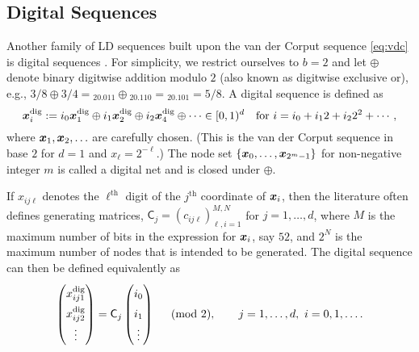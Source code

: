 \documentclass{svproc}
\begin{document}
\subsection{Digital Sequences} \label{sec:digital}

Another family of LD sequences built upon the van der Corput sequence \eqref{eq:vdc} is digital sequences \cite{DicPil10a,Nie92}.  For simplicity, we restrict ourselves to $b = 2$ and let $\oplus$ denote binary digitwise addition modulo $2$ (also known as digitwise exclusive or), e.g., $3/8 \oplus 3/4 = {}_20.011 \oplus {}_20.110 = {}_20.101 = 5/8$.  A digital sequence is defined as
\begin{equation} \label{eq:digital}
	{\boldsymbol{x}}_i^{\text{dig}} := i_0 {\boldsymbol{x}}^{\text{dig}} _1 \oplus i_1 {\boldsymbol{x}}^{\text{dig}} _2 \oplus i_2 {\boldsymbol{x}}^{\text{dig}} _4 \oplus \cdots \in [0,1)^d \quad \text{for }
	i = i_0 + i_12 + i_2 2^2 + \cdots,
\end{equation}
where ${\boldsymbol{x}}_1, {\boldsymbol{x}}_2, \ldots$ are carefully chosen.  (This is the van  der Corput sequence in base $2$ for $d=1$ and $x_\ell = 2^{-\ell}$.) The node set $\{ {\boldsymbol{x}}_0, \ldots, {\boldsymbol{x}}_{2^m-1}\}$  for non-negative integer $m$ is called a digital net and is closed under $\oplus$.

If $x_{ij\ell}$ denotes the $\ell^{\text{th}}$ digit of the $j^{\text{th}}$ coordinate of ${\boldsymbol{x}}_i$, then the literature often defines generating matrices, $\mathsf{C}_j = (c_{ij\ell})_{\ell,i = 1}^{M,N}$ for $j = 1, \ldots, d$, where $M$ is the maximum number of bits in the expression for ${\boldsymbol{x}}_i$, say $52$, and $2^N$ is the maximum number of nodes that is intended to be generated.  The digital sequence can then be defined equivalently as
\begin{equation} \label{eq:digitalB}
\renewcommand{\arraystretch}{1.5}
	\begin{pmatrix} x^{\text{dig}}_{ij1} \\ x^{\text{dig}}_{ij2} \\ \vdots \end{pmatrix}
	= \mathsf{C}_j \begin{pmatrix} i_0 \\ i_1 \\ \vdots \end{pmatrix} \quad \pmod{2}, \qquad j = 1,\ldots, d, \ i = 0, 1, \ldots.
\end{equation}
\end{document}

